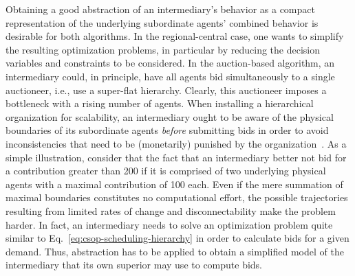 \documentclass[conference]{IEEEtran}
\newcommand{\eref}[1]{Eq.~\ref{#1}}
\begin{document}
Obtaining a good abstraction of an intermediary's behavior as a compact
representation of the underlying subordinate agents' combined behavior is desirable for both algorithms.
In the regional-central case, one wants to simplify the resulting optimization problems, in particular
by reducing the decision variables and constraints to be considered. In the auction-based algorithm, 
an intermediary could, in principle, have all agents bid simultaneously to a single auctioneer, i.e., 
use a super-flat hierarchy. Clearly, this auctioneer imposes a bottleneck with
a rising number of agents. When installing a hierarchical organization for scalability, an intermediary
ought to be aware of the physical boundaries of its subordinate agents \emph{before} submitting bids 
in order to avoid inconsistencies that need to be (monetarily) punished by the organization~\cite{Anders-TAAS-2015}.
As a simple illustration, consider that the fact that an intermediary better not bid for a contribution
greater than 200 if it is comprised of two underlying physical agents with a maximal contribution of
100 each. Even if the mere summation of maximal boundaries constitutes no computational effort, 
the possible trajectories resulting from limited rates of change and disconnectability make 
the problem harder. In fact, an intermediary needs to solve an optimization problem quite similar 
to \eref{eq:csop-scheduling-hierarchy} in order to calculate bids for a given demand. Thus, 
abstraction has to be applied to obtain a simplified model of the intermediary that its
own superior may use to compute bids.
\end{document}
